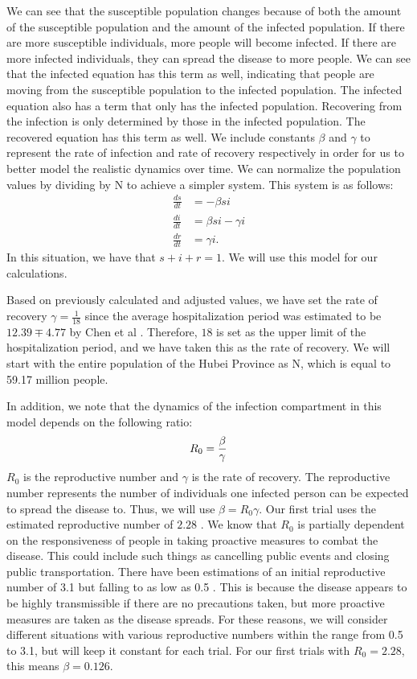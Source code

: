 \documentclass[12pt, a4paper]{article}
\begin{document}
        We can see that the susceptible population changes because of both the amount of the susceptible population and the amount of the infected population. If there are more susceptible individuals, more people will become infected. If there are more infected individuals, they can spread the disease to more people. We can see that the infected equation has this term as well, indicating that people are moving from the susceptible population to the infected population. The infected equation also has a term that only has the infected population. Recovering from the infection is only determined by those in the infected population. The recovered equation has this term as well. We include constants $\beta$ and $\gamma$ to represent the rate of infection and rate of recovery respectively in order for us to better model the realistic dynamics over time. We can normalize the population values by dividing by N to achieve a simpler system. This system is as follows:
        \begin{align*}
            \frac{ds}{dt} &= -\beta si \\
            \frac{di}{dt} &= \beta si - \gamma i \\
            \frac{dr}{dt} &= \gamma i.
        \end{align*}
        In this situation, we have that $s + i + r = 1$. We will use this model for our calculations.
        
        Based on previously calculated and adjusted values, we have set the rate of recovery $\gamma=\frac{1}{18}$ since the average hospitalization period was estimated to be $12.39\mp 4.77$ by Chen et al \cite{gamma}. Therefore, $18$ is set as the upper limit of the hospitalization period, and we have taken this as the rate of recovery. We will start with the entire population of the Hubei Province as N, which is equal to 59.17 million people. 
        
        In addition, we note that the dynamics of the infection compartment in this model depends on the following ratio:
        \[
            R_0 = \frac{\beta}{\gamma} \\
        \]
        $R_0$ is the reproductive number and $\gamma$ is the rate of recovery. The reproductive number represents the number of individuals one infected person can be expected to spread the disease to. Thus, we will use $\beta=R_0 \gamma$. Our first trial uses the estimated reproductive number of $2.28$ \cite{rzero}. We know that $R_0$ is partially dependent on the responsiveness of people in taking proactive measures to combat the disease. This could include such things as cancelling public events and closing public transportation. There have been estimations of an initial reproductive number of 3.1 but falling to as low as 0.5 \cite{parameter}. This is because the disease appears to be highly transmissible if there are no precautions taken, but more proactive measures are taken as the disease spreads. For these reasons, we will consider different situations with various reproductive numbers within the range from 0.5 to 3.1, but will keep it constant for each trial. For our first trials with $R_0 = 2.28$, this means $\beta=0.126$.
        
\end{document}
